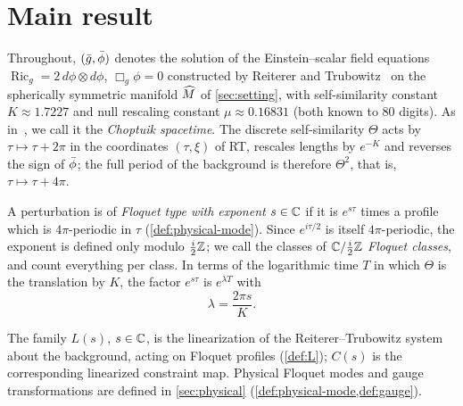 \section{Main result}\label{sec:main}

Throughout, $(\bar g,\bar\phi)$ denotes the solution of the Einstein--scalar field equations
$\operatorname{Ric}_{g}=2\,d\phi\otimes d\phi$, $\Box_{g}\phi=0$ constructed by Reiterer and
Trubowitz~\cite{RT2019} on the spherically symmetric manifold $\widehat M$ of \cref{sec:setting}, with
self-similarity constant $K\approx 1.7227$ and null rescaling constant $\mu\approx 0.16831$ (both known to
$80$ digits). As in~\cite{RT2019}, we call it the \emph{Choptuik spacetime}. The discrete self-similarity
$\Theta$ acts by $\tau\mapsto\tau+2\pi$ in the coordinates $(\tau,\xi)$ of RT, rescales lengths by $e^{-K}$
and reverses the sign of $\bar\phi$; the full period of the background is therefore $\Theta^{2}$, that is,
$\tau\mapsto\tau+4\pi$.

A perturbation is of \emph{Floquet type with exponent $s\in\mathbb{C}$} if it is $e^{s\tau}$ times a profile which is
$4\pi$-periodic in $\tau$ (\cref{def:physical-mode}). Since $e^{i\tau/2}$ is itself $4\pi$-periodic, the
exponent is defined only modulo $\tfrac{i}{2}\mathbb{Z}$; we call the classes of $\mathbb{C}/\tfrac{i}{2}\mathbb{Z}$ \emph{Floquet
classes}, and count everything per class. In terms of the logarithmic time $T$ in which $\Theta$ is the
translation by $K$, the factor $e^{s\tau}$ is $e^{\lambda T}$ with
\begin{equation}\label{eq:lambda}
  \lambda=\frac{2\pi s}{K}.
\end{equation}

The family $L(s)$, $s\in\mathbb{C}$, is the linearization of the Reiterer--Trubowitz system about the background,
acting on Floquet profiles (\cref{def:L}); $C(s)$ is the corresponding linearized constraint map. Physical
Floquet modes and gauge transformations are defined in \cref{sec:physical}
(\cref{def:physical-mode,def:gauge}).

